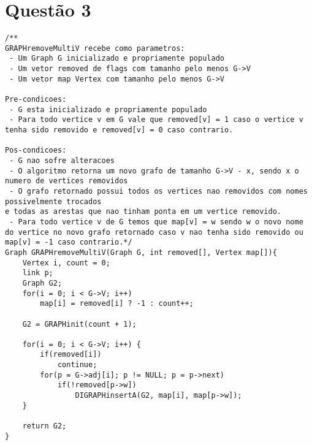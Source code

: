 \documentclass[12pt, a4paper, oneside]{article}
\begin{document}
\section*{Questão 3}
\begin{lstlisting}
/**
GRAPHremoveMultiV recebe como parametros:
 - Um Graph G inicializado e propriamente populado
 - Um vetor removed de flags com tamanho pelo menos G->V
 - Um vetor map Vertex com tamanho pelo menos G->V

Pre-condicoes:
 - G esta inicializado e propriamente populado
 - Para todo vertice v em G vale que removed[v] = 1 caso o vertice v
tenha sido removido e removed[v] = 0 caso contrario.

Pos-condicoes:
 - G nao sofre alteracoes
 - O algoritmo retorna um novo grafo de tamanho G->V - x, sendo x o
numero de vertices removidos
 - O grafo retornado possui todos os vertices nao removidos com nomes
possivelmente trocados
e todas as arestas que nao tinham ponta em um vertice removido.
 - Para todo vertice v de G temos que map[v] = w sendo w o novo nome
do vertice no novo grafo retornado caso v nao tenha sido removido ou
map[v] = -1 caso contrario.*/
Graph GRAPHremoveMultiV(Graph G, int removed[], Vertex map[]){
	Vertex i, count = 0;
	link p;
	Graph G2;
	for(i = 0; i < G->V; i++)
		map[i] = removed[i] ? -1 : count++;
	
	G2 = GRAPHinit(count + 1);
	
	for(i = 0; i < G->V; i++) {
		if(removed[i])
			continue;
		for(p = G->adj[i]; p != NULL; p = p->next)
			if(!removed[p->w])
				DIGRAPHinsertA(G2, map[i], map[p->w]);
	}
	
	return G2;
}
\end{lstlisting}
\end{document}

